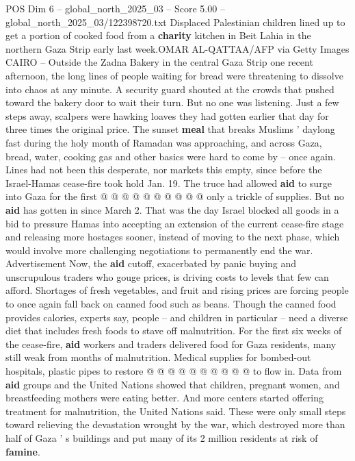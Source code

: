 \begin{textsample}{POS Dim 6 – global\_north\_2025\_03 – Score 5.00 – global\_north\_2025\_03/122398720.txt}  \label{ex:f6_pos_278}
Displaced Palestinian children lined up to get a portion of cooked food from a \textbf{charity} kitchen in Beit Lahia in the northern Gaza Strip early last week.OMAR AL-QATTAA/AFP via Getty Images CAIRO -- Outside the Zadna Bakery in the central Gaza Strip one recent afternoon, the long lines of people waiting for bread were threatening to dissolve into chaos at any minute.
A security guard shouted at the crowds that pushed toward the bakery door to wait their turn.
But no one was listening.
Just a few steps away, scalpers were hawking loaves they had gotten earlier that day for three times the original price.
The sunset \textbf{meal} that breaks Muslims ' daylong fast during the holy month of Ramadan was approaching, and across Gaza, bread, water, cooking gas and other basics were hard to come by -- once again.
Lines had not been this desperate, nor markets this empty, since before the Israel-Hamas cease-fire took hold Jan. 19.
The truce had allowed \textbf{aid} to surge into Gaza for the first @ @ @ @ @ @ @ @ @ @ only a trickle of supplies.
But no \textbf{aid} has gotten in since March 2.
That was the day Israel blocked all goods in a bid to pressure Hamas into accepting an extension of the current cease-fire stage and releasing more hostages sooner, instead of moving to the next phase, which would involve more challenging negotiations to permanently end the war.
Advertisement Now, the \textbf{aid} cutoff, exacerbated by panic buying and unscrupulous traders who gouge prices, is driving costs to levels that few can afford.
Shortages of fresh vegetables, and fruit and rising prices are forcing people to once again fall back on canned food such as beans.
Though the canned food provides calories, experts say, people -- and children in particular -- need a diverse diet that includes fresh foods to stave off malnutrition.
For the first six weeks of the cease-fire, \textbf{aid} workers and traders delivered food for Gaza residents, many still weak from months of malnutrition.
Medical supplies for bombed-out hospitals, plastic pipes to restore @ @ @ @ @ @ @ @ @ @ to flow in.
Data from \textbf{aid} groups and the United Nations showed that children, pregnant women, and breastfeeding mothers were eating better.
And more centers started offering treatment for malnutrition, the United Nations said.
These were only small steps toward relieving the devastation wrought by the war, which destroyed more than half of Gaza ' s buildings and put many of its 2 million residents at risk of \textbf{famine}.

\end{textsample}
